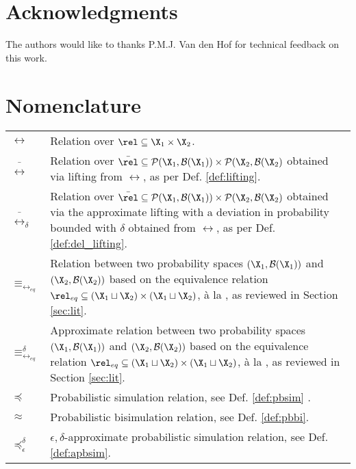 \documentclass[letterpaper, 10 pt, conference]{amsart}
\theoremstyle{definition}
\theoremstyle{example}
\theoremstyle{remark}
\newcommand{\eps}{\epsilon}
\begin{document}
\section*{Acknowledgments}

The authors would like to thanks P.M.J. Van den Hof for technical feedback on this work. 




\newpage

\appendix

\section{Nomenclature}
\begin{longtable}{p{1cm}p{}}
$\rel$&   Relation over $\rel \subseteq \X_1\times \X_2$.\\
$\bar \rel$&   Relation over $\bar\rel\subseteq\mathcal P (\X_1,\mathcal B(\X_1))\times \mathcal P (\X_2,\mathcal B (\X_2)$ obtained via lifting from $\rel$, as per Def. \ref{def:lifting}.\\
$\bar \rel_\delta$&   Relation over $\bar\rel\subseteq\mathcal P (\X_1,\mathcal B(\X_1))\times \mathcal P (\X_2,\mathcal B (\X_2)$ obtained via the approximate  lifting with a deviation in probability bounded with $\delta$ obtained from $\rel$, as per Def. \ref{def:del_lifting}.\\
$\equiv_{\rel_{eq}}$& Relation between  two probability spaces $(\X_1,\mathcal B(\X_1))$ and $(\X_2,\mathcal B (\X_2))$  based on the equivalence relation $\rel_{eq}\subseteq(\X_1\sqcup\X_2)\times (\X_1\sqcup\X_2)$, \`a la \cite{Desharnais2003}, as reviewed in Section \ref{sec:lit}.\\
$\equiv_{\rel_{eq}}^\delta$& Approximate relation between  two probability spaces $(\X_1,\mathcal B(\X_1))$ and $(\X_2,\mathcal B (\X_2))$  based on the equivalence relation $\rel_{eq}\subseteq(\X_1\sqcup\X_2)\times (\X_1\sqcup\X_2)$,  \`a la \cite{Abate2011}, as  reviewed in Section \ref{sec:lit}.\\
$\preceq$&	Probabilistic simulation relation, see  Def. \ref{def:pbsim} .\\
$\approx$&	Probabilistic bisimulation relation, see Def. \ref{def:pbbi}.			\\
$\preceq_\eps^\delta$& $\eps,\delta$-approximate probabilistic simulation relation, see Def. \ref{def:apbsim}.\\	
\end{longtable}
\end{document}
